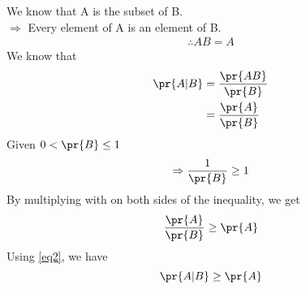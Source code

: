 We know that A is the subset of B. \\
$\Rightarrow$ Every element of A is an element of B.\\
\begin{align}
  \therefore AB = A
  \label{eq1}
\end{align}
We know that 
\begin{equation}
 \begin{split}
\pr{A|B}&= \frac{\pr{AB}}{\pr{B}}  \\ 
 &=\frac{\pr{A}}{\pr{B}}
 \label{eq2}
\end{split}
\end{equation}
Given $0<\pr{B}\leq1$
\begin{align}
  \Rightarrow \frac{1}{\pr{B}} \geq 1 
\end{align}  
By multiplying with  on both sides of the inequality, we get
\begin{align}
 \frac{\pr{A}}{\pr{B}}\geq {\pr{A}}
\end{align}
Using \eqref{eq2}, we have 
$$\pr{A|B} \geq\pr{A}$$